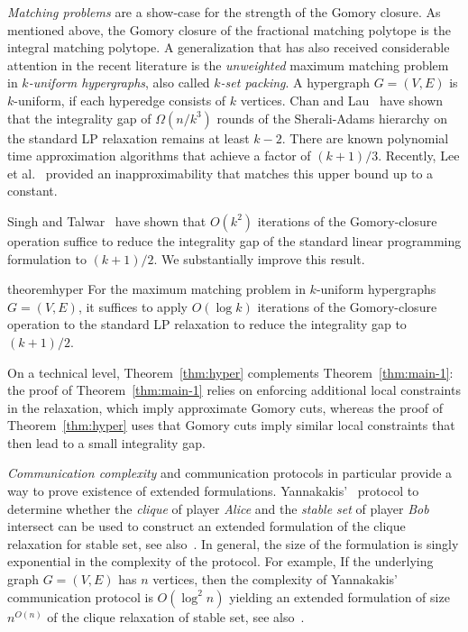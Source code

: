 \documentclass[11pt]{article}
\newcommand{\larstodo}[1]{\todo[backgroundcolor=pinktransparent, linecolor=pink!80]{#1}}
\theoremstyle{remark}
\begin{document}
\medskip
\noindent 
\emph{Matching problems} are a show-case for the strength of the Gomory closure. 
As mentioned above, the Gomory closure of the fractional matching polytope is the integral matching polytope. A generalization that has also received considerable attention in the recent literature is the \emph{unweighted} maximum matching problem in \emph{$k$-uniform hypergraphs}, also called \emph{$k$-set packing}.  A hypergraph $G = (V,E)$ is $k$-uniform, if each hyperedge consists of $k$ vertices. Chan and Lau~\cite{cl12} have shown that the integrality gap of  $Ω(n/k^3)$ rounds of the Sherali-Adams hierarchy on the standard LP relaxation remains at least $k− 2$. There are known polynomial time approximation algorithms that achieve a factor of $(k+1)/3$\cite{hurkens1989size,cygan2013improved,furer2014approximating}. Recently, Lee et al.~\cite{lee2025asymptotically} provided an inapproximability that matches this upper bound up to a constant. 

\smallskip 
\noindent
Singh and Talwar~\cite{st10} have shown that $O(k^2)$ iterations of the Gomory-closure operation suffice to reduce the integrality gap of the standard linear programming formulation to $(k+1)/2$.  We substantially improve this result. 
 \begin{restatable}{theorem}{hyper}\label{thm:hyper}
    For the maximum matching problem in $k$-uniform hypergraphs $G=(V,E)$, it suffices to apply $O(\log k)$ iterations of the Gomory-closure operation to the standard LP relaxation to reduce the integrality gap to $(k+1)/2$.
  \end{restatable}
On a technical level, Theorem~\ref{thm:hyper} complements Theorem~\ref{thm:main-1}:
the proof of Theorem~\ref{thm:main-1} relies on enforcing additional local constraints in the relaxation,
which imply approximate Gomory cuts,
whereas the proof of Theorem~\ref{thm:hyper} uses that Gomory cuts imply similar local constraints that then lead
to a small integrality gap.


\medskip
\noindent 
\emph{Communication complexity} and communication protocols in particular provide a way to prove existence of extended formulations.
 Yannakakis'~\cite{Yannakakis91} protocol to determine whether the \emph{clique} of player \emph{Alice} and the \emph{stable set} of player \emph{Bob} intersect can be used to construct an extended formulation of the clique relaxation for stable set, see also~\cite{rao2020communication}. In general, the size of the formulation is singly exponential in the complexity of the protocol. For example, 
If the underlying graph $G=(V,E)$ has $n$ vertices, then the complexity of Yannakakis' communication protocol is $O(\log^2 n)$ yielding an extended formulation of size $n^{O(n)}$ of the clique relaxation of stable set, see also~\cite{AprileFaenza20}.  
\end{document}
